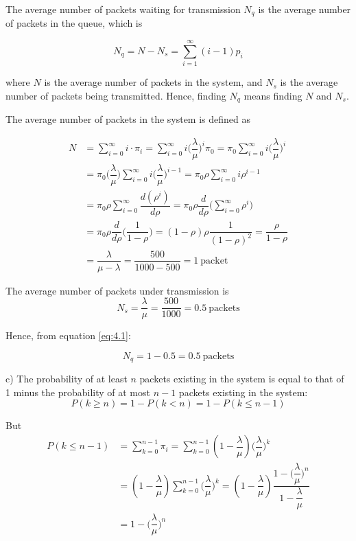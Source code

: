 The average number of packets waiting for transmission $N_q$ is the average
number of packets in the queue, which is

\begin{equation}
  N_q = N - N_s = \sum_{i=1}^{\infty} (i-1) p_i
  \label{eq:4.1}
\end{equation}

where $N$ is the average number of packets in the system, and $N_s$ is the
average number of packets being transmitted. Hence, finding $N_q$ means finding
$N$ and $N_s$.

The average number of packets in the system is defined as

\begin{align*}
  N &= \sum_{i=0}^{\infty} i \cdot \pi_i = \sum_{i=0}^{\infty} i \Big(\dfrac{\lambda}{\mu}\Big)^i \pi_0 =
  \pi_0 \sum_{i=0}^{\infty} i \Big(\dfrac{\lambda}{\mu}\Big)^i \\
  ~ &= \pi_0 \Big(\dfrac{\lambda}{\mu}\Big) \sum_{i=0}^{\infty} i \Big(\dfrac{\lambda}{\mu}\Big)^{i-1} =
  \pi_0 \rho \sum_{i=0}^{\infty} i \rho^{i-1} \\
  ~ &= \pi_0 \rho \sum_{i=0}^{\infty} \dfrac{d(\rho^i)}{d\rho} = \pi_0 \rho \dfrac{d}{d\rho} \Big(\sum_{i=0}^{\infty} \rho^i \Big) \\
  ~ &= \pi_0 \rho \dfrac{d}{d\rho} \Big(\dfrac{1}{1-\rho}\Big) = (1-\rho) \rho \dfrac{1}{(1-\rho)^2} = \dfrac{\rho}{1-\rho} \\
  ~ &= \dfrac{\lambda}{\mu - \lambda} = \dfrac{500}{1000-500} = 1\ \text{packet}
\end{align*}

The average number of packets under transmission is
$$N_s = \dfrac{\lambda}{\mu} = \dfrac{500}{1000} = 0.5\ \text{packets}$$

Hence, from equation \ref{eq:4.1}:

$$N_q = 1 - 0.5 = 0.5\ \text{packets}$$

c)
The probability of at least $n$ packets existing in the system is equal to that
of 1 minus the probability of at most $n-1$ packets existing in the system:
$$P(k \geq n) = 1 - P(k < n) = 1 - P(k \leq n-1)$$

But
\begin{align*}
  P(k \leq n-1) &= \sum_{k=0}^{n-1} \pi_i = \sum_{k=0}^{n-1} (1-\dfrac{\lambda}{\mu})\Big(\dfrac{\lambda}{\mu}\Big)^k \\
  ~             &= (1-\dfrac{\lambda}{\mu})\sum_{k=0}^{n-1} \Big(\dfrac{\lambda}{\mu}\Big)^k =
                   (1-\dfrac{\lambda}{\mu}) \dfrac{1-\Big(\dfrac{\lambda}{\mu}\Big)^n}{1-\dfrac{\lambda}{\mu}} \\
  ~             &= 1-\Big(\dfrac{\lambda}{\mu}\Big)^n
\end{align*}

